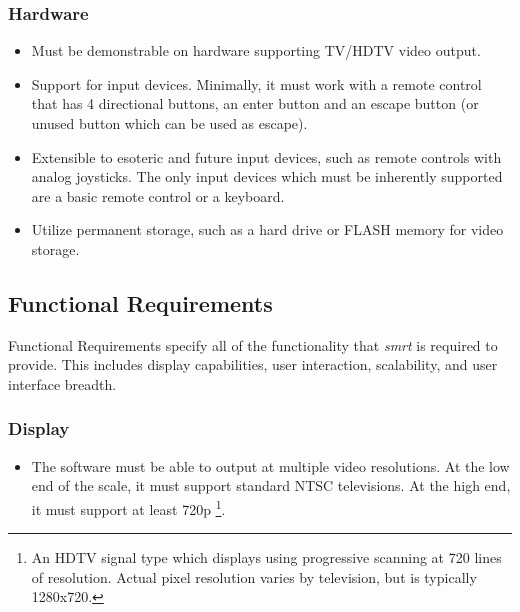 \documentclass[letterpaper, titlepage, 11pt]{article}
\begin{document}
\subsubsection{Hardware}
\begin{itemize}
\item Must be demonstrable on hardware supporting TV/HDTV video output.
\item Support for input devices. Minimally, it must work with a remote control
      that has 4 directional buttons, an enter button and an escape button (or
      unused button which can be used as escape).
\item Extensible to esoteric and future input devices, such as remote controls
      with analog joysticks.  The only input devices which must be inherently
      supported are a basic remote control or a keyboard.
\item Utilize permanent storage, such as a hard drive or FLASH memory for video
      storage.
\end{itemize}

\subsection{Functional Requirements}
Functional Requirements specify all of the functionality that \textit{smrt} is required
to provide.  This includes display capabilities, user interaction, scalability, and
user interface breadth.

\subsubsection{Display}
\begin{itemize}
\item The software must be able to output at multiple video resolutions. At the low
      end of the scale, it must support standard NTSC televisions.  At the high end,
      it must support at least 720p \footnote{An HDTV signal type which displays using
      progressive scanning at 720 lines of resolution.  Actual pixel resolution varies
      by television, but is typically 1280x720.}.
\end{itemize}
\end{document}
